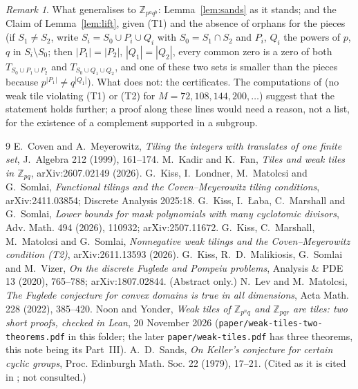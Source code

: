 \documentclass[11pt,a4paper]{amsart}
\theoremstyle{definition}
\theoremstyle{remark}
\newtheorem{remark}[theorem]{Remark}
\newcommand{\Z}{\mathbb{Z}}
\begin{document}
\begin{remark}
What generalises to $\Z_{p^aq^b}$: Lemma~\ref{lem:sands} as it stands; and the Claim of Lemma~\ref{lem:lift},
given (T1) and the absence of orphans for the pieces (if $S_1\ne S_2$, write $S_i=S_0\cup P_i\cup Q_i$ with
$S_0=S_1\cap S_2$ and $P_i$, $Q_i$ the powers of $p$, $q$ in $S_i\setminus S_0$; then $|P_1|=|P_2|$,
$|Q_1|=|Q_2|$, every common zero is a zero of both $T_{S_0\cup P_1\cup P_2}$ and $T_{S_0\cup Q_1\cup Q_2}$, and
one of these two sets is smaller than the pieces because $p^{|P_1|}\ne q^{|Q_1|}$). What does not: the
certificates. The computations of \cite{NY} (no weak tile violating (T1) or (T2) for $M=72,108,144,200,\dots$)
suggest that the statement holds further; a proof along these lines would need a reason, not a list, for the
existence of a complement supported in a subgroup.
\end{remark}

\begin{thebibliography}{9}
 E.~Coven and A.~Meyerowitz, \emph{Tiling the integers with translates of one finite set},
J.~Algebra 212 (1999), 161--174.
 M.~Kadir and K.~Fan, \emph{Tiles and weak tiles in $\Z_{pq}$}, arXiv:2607.02149 (2026).
 G.~Kiss, I.~Londner, M.~Matolcsi and G.~Somlai, \emph{Functional tilings and the
Coven--Meyerowitz tiling conditions}, arXiv:2411.03854; Discrete Analysis 2025:18.
 G.~Kiss, I.~{\L}aba, C.~Marshall and G.~Somlai, \emph{Lower bounds for mask polynomials with many
cyclotomic divisors}, Adv. Math. 494 (2026), 110932; arXiv:2507.11672.
 G.~Kiss, C.~Marshall, M.~Matolcsi and G.~Somlai, \emph{Nonnegative weak tilings and the
Coven--Meyerowitz condition (T2)}, arXiv:2611.13593 (2026).
 G.~Kiss, R.~D.~Malikiosis, G.~Somlai and M.~Vizer, \emph{On the discrete Fuglede and Pompeiu
problems}, Analysis \& PDE 13 (2020), 765--788; arXiv:1807.02844. (Abstract only.)
 N.~Lev and M.~Matolcsi, \emph{The Fuglede conjecture for convex domains is true in all
dimensions}, Acta Math. 228 (2022), 385--420.
 Noon and Yonder, \emph{Weak tiles of $\Z_{p^nq}$ and $\Z_{pqr}$ are tiles: two short proofs, checked
in Lean}, 20 November 2026 (\texttt{paper/weak-tiles-two-theorems.pdf} in this folder; the later
\texttt{paper/weak-tiles.pdf} has three theorems, this note being its Part~III).
 A.~D.~Sands, \emph{On Keller's conjecture for certain cyclic groups}, Proc. Edinburgh Math. Soc. 22
(1979), 17--21. (Cited as it is cited in \cite{CM}; not consulted.)
\end{thebibliography}
\end{document}
